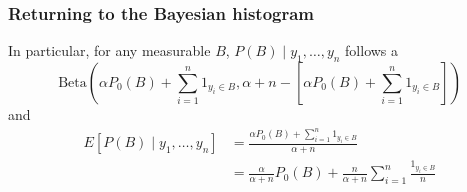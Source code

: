 \documentclass{beamer}
\begin{document}
\begin{frame}
\frametitle{Returning to the Bayesian histogram}

In particular, for any measurable $B$, $P(B)\mid y_1, \ldots, y_n$ follows a 
$$
\text{Beta}\left(\alpha P_0(B) + \sum_{i=1}^n 1_{y_i \in B},  \alpha + n -  \left[ \alpha P_0(B) + \sum_{i=1}^n 1_{y_i \in B} \right] \right)
$$
and
\begin{align*}
E[P(B) \mid y_1, \ldots, y_n ] 
&= \frac{\alpha P_0(B) + \sum_{i=1}^n 1_{y_i \in B}}{\alpha + n} \\
&= \frac{\alpha }{\alpha + n}P_0(B)  + \frac{n}{\alpha + n}\sum_{i=1}^n \frac{1_{y_i \in B}}{n}
\end{align*}

\end{frame}
\end{document}
